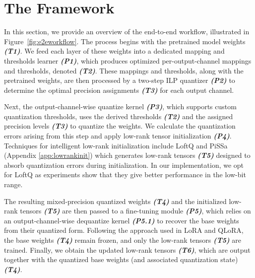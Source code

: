 \section{The \FWName{} Framework}\label{sec:e2eframework}

In this section, we provide an overview of the \FWName{} end-to-end workflow, illustrated in Figure~\ref{fig:e2eworkflow}. The process begins with the pretrained model weights \textbf{\textit{(T1)}}. We feed each layer of these weights into a dedicated mapping and thresholds learner \textbf{\textit{(P1)}}, which produces optimized per-output-channel mappings and thresholds, denoted \textbf{\textit{(T2)}}.
These mappings and thresholds, along with the pretrained weights, are then processed by a two-step ILP quantizer \textbf{\textit{(P2)}} to determine the optimal precision assignments \textbf{\textit{(T3)}} for each output channel.

Next, the output-channel-wise quantize kernel \textbf{\textit{(P3)}}, which supports custom quantization thresholds, uses the derived thresholds \textbf{\textit{(T2)}} and the assigned precision levels \textbf{\textit{(T3)}} to quantize the weights. We calculate the quantization errors arising from this step and apply low-rank tensor initialization \textbf{\textit{(P4)}}. Techniques for intelligent low-rank initialization include LoftQ  \cite{li2023loftq} and PiSSa \cite{meng2024pissa} (Appendix \ref{app:lowrankinit}) which generates low-rank tensors \textbf{\textit{(T5)}} designed to absorb quantization errors during initialization. In our implementation, we opt for LoftQ \cite{li2023loftq} as experiments show that they give better performance in the low-bit range.

The resulting mixed-precision quantized weights \textbf{\textit{(T4)}} and the initialized low-rank tensors \textbf{\textit{(T5)}} are then passed to a fine-tuning module \textbf{\textit{(P5)}}, which relies on an output-channel-wise dequantize kernel \textbf{\textit{(P5.1)}} to recover the base weights from their quantized form. Following the approach used in LoRA and QLoRA, the base weights \textbf{\textit{(T4)}} remain frozen, and only the low-rank tensors \textbf{\textit{(T5)}} are trained. Finally, we obtain the updated low-rank tensors \textbf{\textit{(T6)}}, which are output together with the quantized base weights (and associated quantization state) \textbf{\textit{(T4)}}.
